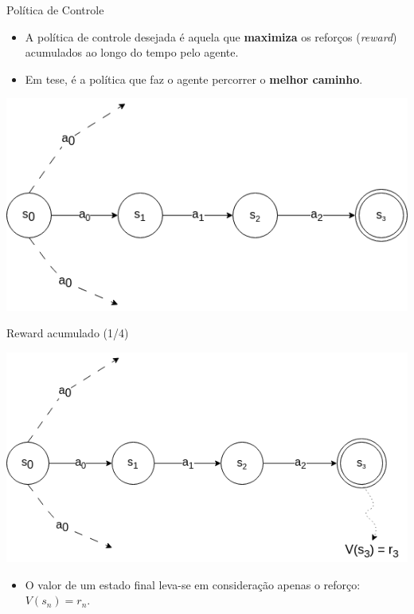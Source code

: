 \documentclass{beamer}
\begin{document}
\begin{frame}{Política de Controle}
	\begin{itemize}
	\item A política de controle desejada é aquela que \textbf{maximiza} os reforços 
	(\textit{reward}) acumulados ao longo do tempo pelo 
	agente.
	\item Em tese, é a política que faz o agente percorrer o \textbf{melhor caminho}. 
	\end{itemize}


  \begin{center}
	\includegraphics[width=.8\textwidth]{figuras/grafo_rewards_0.png}
\end{center}

\end{frame}


\begin{frame}{Reward acumulado (1/4)}

\begin{center}
	\includegraphics[width=.8\textwidth]{figuras/grafo_rewards_1.png}
\end{center}

\begin{itemize}	
	\item O valor de um estado final leva-se em consideração apenas o 
	reforço: $V(s_{n}) = r_{n}$.
\end{itemize}

\end{frame}
\end{document}
